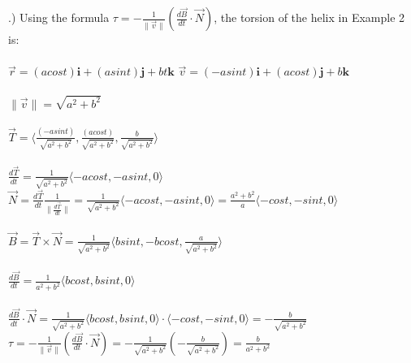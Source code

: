 \documentclass[12pt]{article}
\begin{document}
.) Using the formula $\tau = -\frac{1}{\| \vec{v} \|}(\frac{d\vec{B}}{dt} \cdot \vec{N})$, the torsion of the helix in Example 2 is:\\\\
\noindent $\vec{r} = (acos{t})\mathbf{i} + (asin{t})\mathbf{j} + bt\mathbf{k}$
\noindent $\vec{v} = (-asin{t})\mathbf{i} + (acos{t})\mathbf{j} + b\mathbf{k}$\\\\
\noindent $\| \vec{v} \| = \sqrt{a^{2} + b^{2}}$\\\\
\noindent $\vec{T} = \langle \frac{(-asin{t})}{\sqrt{a^{2} + b^{2}}}, \frac{(acos{t})}{\sqrt{a^{2} + b^{2}}}, 
	\frac{b}{\sqrt{a^{2} + b^{2}}} \rangle$\\\\
\noindent $\frac{d\vec{T}}{dt} = \frac{1}{\sqrt{a^{2} + b^{2}}}\langle -acos{t}, -asin{t}, 0\rangle$
\noindent $\vec{N} = \frac{d\vec{T}}{dt}\frac{1}{\| \frac{d\vec{T}}{dt}\| } = \frac{1}{\sqrt{a^{2} + b^{2}}}\langle -acos{t}, -asin{t}, 0\rangle =\frac{a^{2} + b^{2}}{a} \langle -cos{t}, -sin{t}, 0\rangle$\\\\
\noindent $\vec{B} = \vec{T} \times \vec{N} = \frac{1}{\sqrt{a^{2}+ b^{2}}}\langle bsin{t}, -bcos{t}, \frac{a}{\sqrt{a^{2} + b^{2}}} \rangle$\\\\
\noindent $\frac{d\vec{B}}{dt} =  \frac{1}{a^{2}+b^{2}} \langle bcos{t} , bsin{t}, 0\rangle$\\\\
\noindent $\frac{d\vec{B}}{dt}\cdot \vec{N} = \frac{1}{\sqrt{a^{2} + b^{2}} } \langle bcos{t}, bsin{t}, 0 \rangle \cdot \langle -cos{t}, -sin{t}, 0\rangle = -\frac{b}{\sqrt{a^{2} + b^{2}}}$
\noindent $\tau = -\frac{1}{\| \vec{v} \|}(\frac{d\vec{B}}{dt} \cdot \vec{N}) = -\frac{1}{\sqrt{a^{2} + b^{2}} } (-\frac{b}{\sqrt{a^{2} + b^{2}}}) = \frac{b}{a^{2} + b^{2}}$\\\\
\end{document}
